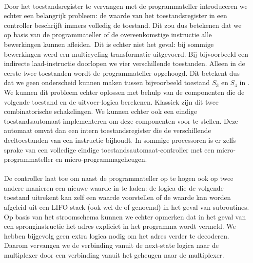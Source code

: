 \paragraph{}
Door het toestandsregister te vervangen met de programmateller introduceren we echter een belangrijk probleem: de waarde van het toestandsregister in een controller beschrijft immers volledig de toestand. Dit zou dus betekenen dat we op basis van de programmateller of de overeenkomstige instructie alle bewerkingen kunnen afleiden. Dit is echter niet het geval: bij sommige bewerkingen werd een multicycling transformatie uitgevoerd. Bij bijvoorbeeld een indirecte laad-instructie doorlopen we vier verschillende toestanden. Alleen in de eerste twee toestanden wordt de programmateller opgehoogd. Dit betekent dus dat we geen onderscheid kunnen maken tussen bijvoorbeeld toestand $S_3$ en $S_4$ in . We kunnen dit probleem echter oplossen met behulp van de componenten die de volgende toestand en de uitvoer-logica berekenen. Klassiek zijn dit twee combinatorische schakelingen. We kunnen echter ook een eindige toestandsautomaat implementeren om deze componenten voor te stellen. Deze automaat omvat dan een intern toestandsregister die de verschillende deeltoestanden van een instructie bijhoudt. In sommige processoren is er zelfs sprake van een volledige eindige toestandsautomaat-controller met een micro-programmateller en micro-programmageheugen.
\paragraph{}
De controller laat toe om naast de programmateller op te hogen ook op twee andere manieren een nieuwe waarde in te laden: de logica die de volgende toestand uitrekent kan zelf een waarde voorstellen of de waarde kan worden afgeleid uit een LIFO-stack (ook wel de  of  genoemd) in het geval van subroutines. Op basis van het stroomschema kunnen we echter opmerken dat in het geval van een spronginstructie het adres expliciet in het programma wordt vermeld. We hebben bijgevolg geen extra logica nodig om het adres verder te decoderen. Daarom vervangen we de verbinding vanuit de next-state logica naar de multiplexer door een verbinding vanuit het geheugen naar de multiplexer.
